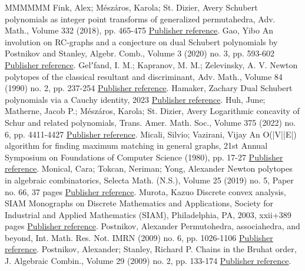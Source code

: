 \documentclass[11pt]{article}
\theoremstyle{definition}
\numberwithin{equation}{section}
\begin{document}
\begin{thebibliography}{MMMMMM}
 Fink, Alex; Mészáros, Karola; St. Dizier, Avery Schubert polynomials as integer point transforms of generalized permutahedra, Adv. Math., Volume 332 (2018), pp. 465-475 \href{https://alco.centre-mersenne.org/articles/10.5802/alco.450/#FMD}{Publisher reference}.
 Gao, Yibo An involution on RC-graphs and a conjecture on dual Schubert polynomials by Postnikov and Stanley, Algebr. Comb., Volume 3 (2020) no. 3, pp. 593-602 \href{https://alco.centre-mersenne.org/articles/10.5802/alco.450/#InvolRC}{Publisher reference}.
 Gelʼfand, I. M.; Kapranov, M. M.; Zelevinsky, A. V. Newton polytopes of the classical resultant and discriminant, Adv. Math., Volume 84 (1990) no. 2, pp. 237-254 \href{https://alco.centre-mersenne.org/articles/10.5802/alco.450/#GKZ}{Publisher reference}.
 Hamaker, Zachary Dual Schubert polynomials via a Cauchy identity, 2023 \href{https://alco.centre-mersenne.org/articles/10.5802/alco.450/#Hamaker}{Publisher reference}.
 Huh, June; Matherne, Jacob P.; Mészáros, Karola; St. Dizier, Avery Logarithmic concavity of Schur and related polynomials, Trans. Amer. Math. Soc., Volume 375 (2022) no. 6, pp. 4411-4427 \href{https://alco.centre-mersenne.org/articles/10.5802/alco.450/#HuhMeszaroLorSchur}{Publisher reference}.
 Micali, Silvio; Vazirani, Vijay An O(|V||E|) algorithm for finding maximum matching in general graphs, 21st Annual Symposium on Foundations of Computer Science (1980), pp. 17-27 \href{https://alco.centre-mersenne.org/articles/10.5802/alco.450/#inproceedings}{Publisher reference}.
 Monical, Cara; Tokcan, Neriman; Yong, Alexander Newton polytopes in algebraic combinatorics, Selecta Math. (N.S.), Volume 25 (2019) no. 5, Paper no. 66, 37 pages \href{https://alco.centre-mersenne.org/articles/10.5802/alco.450/#NewtonPolyinAC}{Publisher reference}.
 Murota, Kazuo Discrete convex analysis, SIAM Monographs on Discrete Mathematics and Applications, Society for Industrial and Applied Mathematics (SIAM), Philadelphia, PA, 2003, xxii+389 pages \href{https://alco.centre-mersenne.org/articles/10.5802/alco.450/#DicreteConvexAnaly}{Publisher reference}.
 Postnikov, Alexander Permutohedra, associahedra, and beyond, Int. Math. Res. Not. IMRN (2009) no. 6, pp. 1026-1106 \href{https://alco.centre-mersenne.org/articles/10.5802/alco.450/#postnikovpermutohedra}{Publisher reference}.
 Postnikov, Alexander; Stanley, Richard P. Chains in the Bruhat order, J. Algebraic Combin., Volume 29 (2009) no. 2, pp. 133-174 \href{https://alco.centre-mersenne.org/articles/10.5802/alco.450/#PostnikovStanley}{Publisher reference}.

\end{thebibliography}
\end{document}
